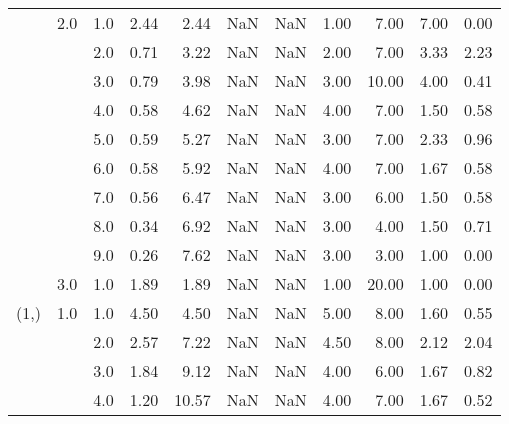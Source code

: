 \begin{tabular}{lllrrrrrrrr}
     & 2.0 & 1.0  &      2.44 &       2.44 &               NaN &                NaN & 1.00 &   7.00 &             7.00 &                         0.00 \\
     &     & 2.0  &      0.71 &       3.22 &               NaN &                NaN & 2.00 &   7.00 &             3.33 &                         2.23 \\
     &     & 3.0  &      0.79 &       3.98 &               NaN &                NaN & 3.00 &  10.00 &             4.00 &                         0.41 \\
     &     & 4.0  &      0.58 &       4.62 &               NaN &                NaN & 4.00 &   7.00 &             1.50 &                         0.58 \\
     &     & 5.0  &      0.59 &       5.27 &               NaN &                NaN & 3.00 &   7.00 &             2.33 &                         0.96 \\
     &     & 6.0  &      0.58 &       5.92 &               NaN &                NaN & 4.00 &   7.00 &             1.67 &                         0.58 \\
     &     & 7.0  &      0.56 &       6.47 &               NaN &                NaN & 3.00 &   6.00 &             1.50 &                         0.58 \\
     &     & 8.0  &      0.34 &       6.92 &               NaN &                NaN & 3.00 &   4.00 &             1.50 &                         0.71 \\
     &     & 9.0  &      0.26 &       7.62 &               NaN &                NaN & 3.00 &   3.00 &             1.00 &                         0.00 \\
     & 3.0 & 1.0  &      1.89 &       1.89 &               NaN &                NaN & 1.00 &  20.00 &             1.00 &                         0.00 \\
(1,) & 1.0 & 1.0  &      4.50 &       4.50 &               NaN &                NaN & 5.00 &   8.00 &             1.60 &                         0.55 \\
     &     & 2.0  &      2.57 &       7.22 &               NaN &                NaN & 4.50 &   8.00 &             2.12 &                         2.04 \\
     &     & 3.0  &      1.84 &       9.12 &               NaN &                NaN & 4.00 &   6.00 &             1.67 &                         0.82 \\
     &     & 4.0  &      1.20 &      10.57 &               NaN &                NaN & 4.00 &   7.00 &             1.67 &                         0.52 \\

\end{tabular}
